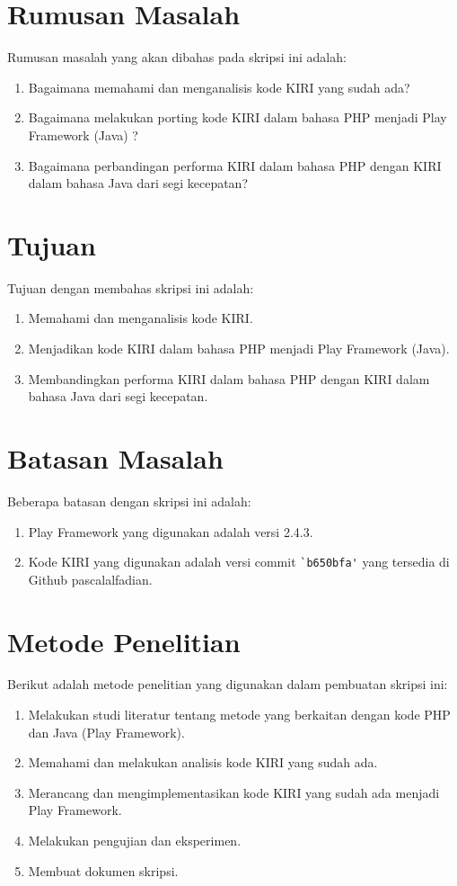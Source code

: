 \section{Rumusan Masalah}
\label{rumusanMasalah}
Rumusan masalah yang akan dibahas pada skripsi ini adalah:
\begin{enumerate}
	\item Bagaimana memahami dan menganalisis kode KIRI yang sudah ada?
	\item Bagaimana melakukan porting kode KIRI dalam bahasa PHP menjadi Play Framework (Java) ?
	\item Bagaimana perbandingan performa KIRI dalam bahasa PHP dengan KIRI dalam bahasa Java dari segi kecepatan?
\end{enumerate}

\section{Tujuan}
\label{sec:tujuan}
Tujuan dengan membahas skripsi ini adalah:
\begin{enumerate}
	\item Memahami dan menganalisis kode KIRI.
	\item Menjadikan kode KIRI dalam bahasa PHP menjadi Play Framework (Java).
	\item Membandingkan performa KIRI dalam bahasa PHP dengan KIRI dalam bahasa Java dari segi kecepatan.
\end{enumerate}

\section{Batasan Masalah}
\label{sec:batasanMasalah}
Beberapa batasan dengan skripsi ini adalah:
\begin{enumerate}
	\item Play Framework yang digunakan adalah versi 2.4.3.
	\item Kode KIRI yang digunakan adalah versi commit \verb!`b650bfa'! yang tersedia di Github pascalalfadian\cite{githubkiri}.
\end{enumerate}

\section{Metode Penelitian}
\label{sec:metodePenelitian}
Berikut adalah metode penelitian yang digunakan dalam pembuatan skripsi ini:
	\begin{enumerate}
		\item Melakukan studi literatur tentang metode yang berkaitan dengan kode PHP dan Java (Play Framework).
		\item Memahami dan melakukan analisis kode KIRI yang sudah ada.
		\item Merancang dan mengimplementasikan kode KIRI yang sudah ada menjadi Play Framework.
		\item Melakukan pengujian dan eksperimen.
		\item Membuat dokumen skripsi.
	\end{enumerate}
	
